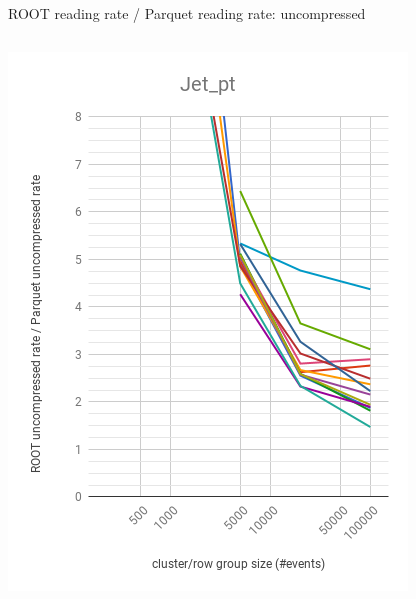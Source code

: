 \documentclass[aspectratio=169]{beamer}
\begin{document}
\begin{frame}{ROOT reading rate / Parquet reading rate: uncompressed}
\begin{columns}
\begin{center}
\includegraphics[width=\linewidth]{root-none-parquet-none-Jet_pt.png}
\end{center}
\begin{center}

\end{center}
\end{columns}
\end{frame}
\end{document}
